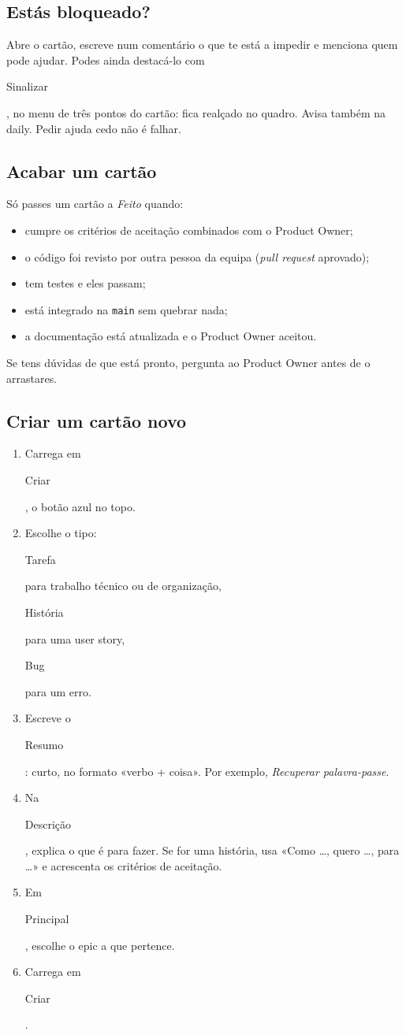 \documentclass[11pt,a4paper]{article}
\newcommand{\btn}[1]{{\setlength{\fboxsep}{1.6pt}\colorbox{azulclaro}{\sffamily\small\strut #1}}}
\begin{document}
\subsection{Estás bloqueado?}

Abre o cartão, escreve num comentário o que te está a impedir e menciona quem pode ajudar. Podes ainda destacá-lo com \btn{Sinalizar}, no menu de três pontos do cartão: fica realçado no quadro. Avisa também na daily. Pedir ajuda cedo não é falhar.

\subsection{Acabar um cartão}

Só passes um cartão a \textit{Feito} quando:

\begin{itemize}[label=\textcolor{azul}{$\square$}]
  \item cumpre os critérios de aceitação combinados com o Product Owner;
  \item o código foi revisto por outra pessoa da equipa (\textit{pull request} aprovado);
  \item tem testes e eles passam;
  \item está integrado na \texttt{main} sem quebrar nada;
  \item a documentação está atualizada e o Product Owner aceitou.
\end{itemize}

Se tens dúvidas de que está pronto, pergunta ao Product Owner antes de o arrastares.

\subsection{Criar um cartão novo}

\begin{enumerate}
  \item Carrega em \btn{Criar}, o botão azul no topo.
  \item Escolhe o tipo: \btn{Tarefa} para trabalho técnico ou de organização, \btn{História} para uma user story, \btn{Bug} para um erro.
  \item Escreve o \btn{Resumo}: curto, no formato «verbo + coisa». Por exemplo, \textit{Recuperar palavra-passe}.
  \item Na \btn{Descrição}, explica o que é para fazer. Se for uma história, usa «Como \dots, quero \dots, para \dots» e acrescenta os critérios de aceitação.
  \item Em \btn{Principal}, escolhe o epic a que pertence.
  \item Carrega em \btn{Criar}.
\end{enumerate}
\end{document}
